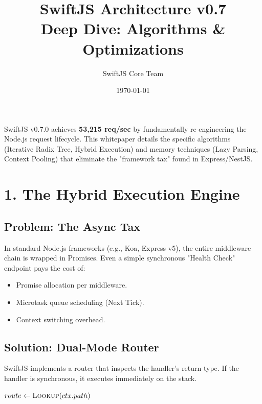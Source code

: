 \documentclass[11pt, a4paper]{article}
\title{\textbf{\Huge SwiftJS Architecture v0.7}\\ \Large Deep Dive: Algorithms \& Optimizations}
\author{SwiftJS Core Team}
\date{\today}
\begin{document}
\maketitle

\begin{tcolorbox}[colback=swiftblue!5,colframe=swiftblue,title=\textbf{Executive Summary}]
SwiftJS v0.7.0 achieves \textbf{53,215 req/sec} by fundamentally re-engineering the Node.js request lifecycle. This whitepaper details the specific algorithms (Iterative Radix Tree, Hybrid Execution) and memory techniques (Lazy Parsing, Context Pooling) that eliminate the "framework tax" found in Express/NestJS.
\end{tcolorbox}

\tableofcontents

\section{1. The Hybrid Execution Engine}

\subsection{Problem: The Async Tax}
In standard Node.js frameworks (e.g., Koa, Express v5), the entire middleware chain is wrapped in Promises. Even a simple synchronous "Health Check" endpoint pays the cost of:
\begin{itemize}
    \item Promise allocation per middleware.
    \item Microtask queue scheduling (Next Tick).
    \item Context switching overhead.
\end{itemize}

\subsection{Solution: Dual-Mode Router}
SwiftJS implements a router that inspects the handler's return type. If the handler is synchronous, it executes immediately on the stack.

\begin{algorithm}[H]
\caption{Hybrid Execution Flow}\label{alg:hybrid}
\begin{algorithmic}[1]
    \State $route \gets \Call{Lookup}{ctx.path}$
        \State {}
        \State {} 
        \State \Return
    \EndIf
    \State {}
    \State \Return {}
\EndFunction
\end{algorithmic}
\end{algorithm}
\end{document}
